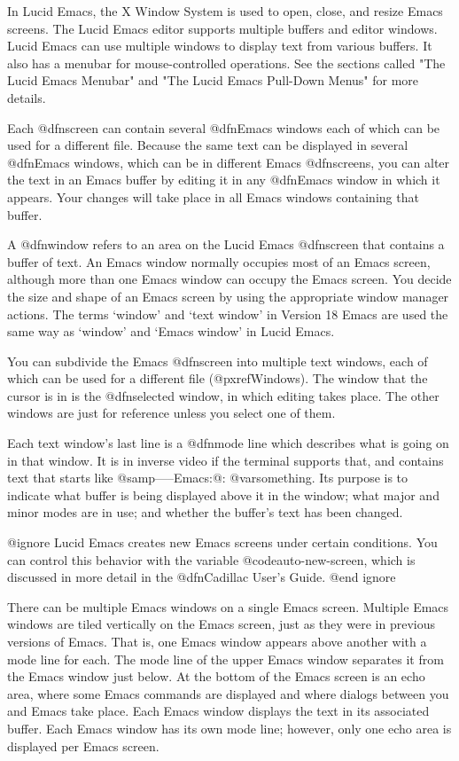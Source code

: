   In Lucid Emacs, the X Window System is used to open, close, and resize
Emacs screens.  
The Lucid Emacs editor supports multiple buffers and editor windows.
Lucid Emacs can 
use multiple windows to display text from various buffers.  
It also has a menubar for mouse-controlled operations.  
See the sections called "The Lucid Emacs Menubar" and "The Lucid Emacs 
Pull-Down Menus" for more details.

  Each @dfn{screen} can contain several @dfn{Emacs windows} each of 
which can be used for a different file.  Because the same text can be 
displayed in several @dfn{Emacs windows}, which can be in different Emacs 
@dfn{screens},
you can alter the text in an Emacs buffer by editing it in any @dfn{Emacs 
window} 
in which it appears.  Your changes will take place in all Emacs windows 
containing that buffer.  

  A @dfn{window} refers to an area on the Lucid Emacs @dfn{screen} 
that contains a buffer of text.  
An Emacs window normally 
occupies most of an Emacs screen, although 
more than one Emacs window can occupy the Emacs screen.
You decide 
the size and shape of an Emacs screen by using the appropriate window 
manager actions. 
The terms `window' and `text window' in Version 18 Emacs are used the same way
as `window' and `Emacs window' in Lucid Emacs.  

  You can subdivide the Emacs @dfn{screen} 
into multiple text windows, each of which can be used for a
different file (@pxref{Windows}).  The window that the cursor is in is the
@dfn{selected window}, in which editing takes place.  The other windows are
just for reference unless you select one of them.

  Each text window's last line is a @dfn{mode line} which describes what is
going on in that window.  It is in inverse video if the terminal supports
that, and contains text that starts like @samp{-----Emacs:@: @var{something}}. Its
purpose is to indicate what buffer is being displayed above it in the
window; what major and minor modes are in use; and whether the buffer's
text has been changed.

@ignore
  Lucid Emacs creates new Emacs screens under certain conditions. You 
can control this behavior with the variable @code{auto-new-screen}, which is 
discussed in more detail in the @dfn{Cadillac User's Guide}. 
@end ignore

  There can be multiple Emacs windows on a single Emacs 
screen. 
Multiple Emacs windows are tiled vertically on the Emacs 
screen, just as they were in previous versions of Emacs. 
That is, one Emacs window appears above 
another with a mode line for each.
The mode line of the upper Emacs                             
window separates it from the Emacs window just below. At the bottom 
of the Emacs screen is an echo area, where some Emacs commands are 
displayed and where dialogs between you and Emacs take place. Each 
Emacs window displays the text in its associated buffer.
Each Emacs window has its own mode line; however, only one echo 
area is displayed per Emacs screen.

